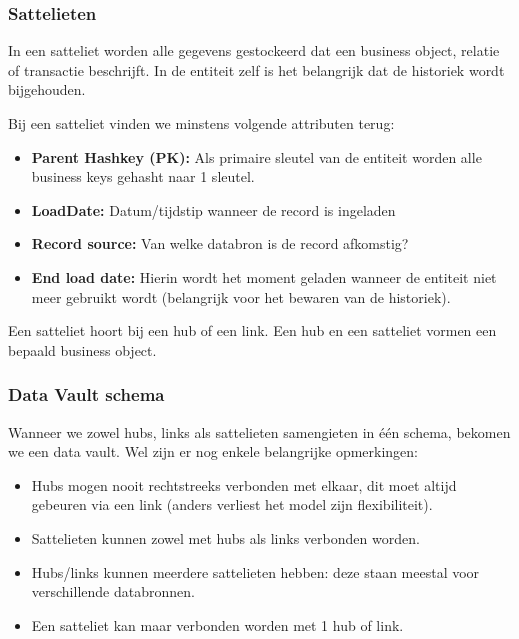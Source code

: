 \subsubsection{Sattelieten}
In een satteliet worden alle gegevens gestockeerd dat een business object, relatie of transactie beschrijft. In de entiteit zelf is het belangrijk dat de historiek wordt bijgehouden. \autocite{Linstedt2016}

Bij een satteliet vinden we minstens volgende attributen terug:

\begin{itemize}
	\item \textbf{Parent Hashkey (PK):} Als primaire sleutel van de entiteit worden alle business keys gehasht naar 1 sleutel.
	\item \textbf{LoadDate:} Datum/tijdstip wanneer de record is ingeladen
	\item \textbf{Record source:} Van welke databron is de record afkomstig?
	\item \textbf{End load date:} Hierin wordt het moment geladen wanneer de entiteit niet meer gebruikt wordt (belangrijk voor het bewaren van de historiek).
\end{itemize} 

Een satteliet hoort bij een hub of een link. Een hub en een satteliet vormen een bepaald business object. 

\subsubsection{Data Vault schema}
Wanneer we zowel hubs, links als sattelieten samengieten in één schema, bekomen we een data vault. Wel zijn er nog enkele belangrijke opmerkingen:

\begin{itemize}
	\item Hubs mogen nooit rechtstreeks verbonden met elkaar, dit moet altijd gebeuren via een link (anders verliest het model zijn flexibiliteit).
	\item Sattelieten kunnen zowel met hubs als links verbonden worden.
	\item Hubs/links kunnen meerdere sattelieten hebben: deze staan meestal voor verschillende databronnen.
	\item Een satteliet kan maar verbonden worden met 1 hub of link. 
\end{itemize} 

